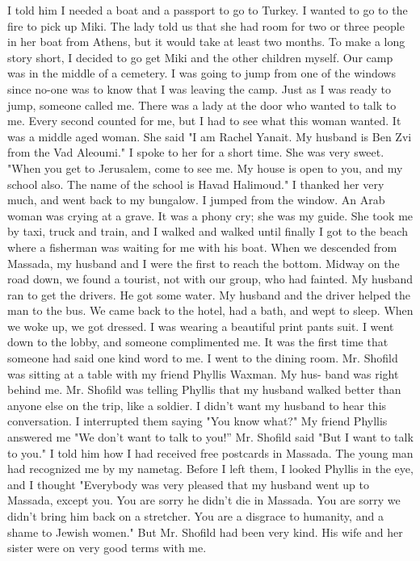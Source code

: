 I told him I needed a boat and a passport to go to Turkey. I wanted to go to the fire to pick up Miki. The lady told us that she had room for two or three people in her boat from Athens, but it 
would take at least two months. To make a long story short, I decided 
to go get Miki and the other children myself. 
Our camp was in the middle of a cemetery. I was going to jump from 
one of the windows since no-one was to know that I was leaving the camp. 
Just as I was ready to jump, someone called me. There was a lady at the 
door who wanted to talk to me. Every second counted for me, but I had 
to see what this woman wanted. It was a middle aged woman. She said "I 
am Rachel Yanait. My husband is Ben Zvi from the Vad Aleoumi." I spoke 
to her for a short time. She was very sweet. "When you get to Jerusalem, come to see me. My house is open to you, and my school also. The name of the school is Havad Halimoud." I thanked her very much, and went back to my bungalow. I jumped from the window. 
An Arab woman was crying at a grave. It was a phony cry; she was my 
guide. She took me by taxi, truck and train, and I walked and walked until finally I got to the beach where a fisherman was waiting for me with his boat. 
When we descended from Massada, my husband and I were the first to 
reach the bottom. Midway on the road down, we found a tourist, not with 
our group, who had fainted. My husband ran to get the drivers. He got 
some water. My husband and the driver helped the man to the bus. 
We came back to the hotel, had a bath, and wept to sleep. When we 
woke up, we got dressed. I was wearing a beautiful print pants suit. 
I went down to the lobby, and someone complimented me. It was the first 
time that someone had said one kind word to me. I went to the dining room. 
Mr. Shofild was sitting at a table with my friend Phyllis Waxman. My hus-
band was right behind me. Mr. Shofild was telling Phyllis that my husband 
walked better than anyone else on the trip, like a soldier. I didn't want 
my husband to hear this conversation. I interrupted them saying "You 
know what?" My friend Phyllis answered me "We don't want to talk to you!” 
Mr. Shofild said "But I want to talk to you." I told him how I had received free postcards in Massada. The young man had recognized me by my nametag. 
Before I left them, I looked Phyllis in the eye, and I thought "Everybody was very pleased that my husband went up to Massada, except you. You are sorry he didn't die in Massada. You are sorry we didn't bring him back on a stretcher. You are a disgrace to humanity, and a shame to Jewish 
women." But Mr. Shofild had been very kind. His wife and her sister were on very good terms with me. 
